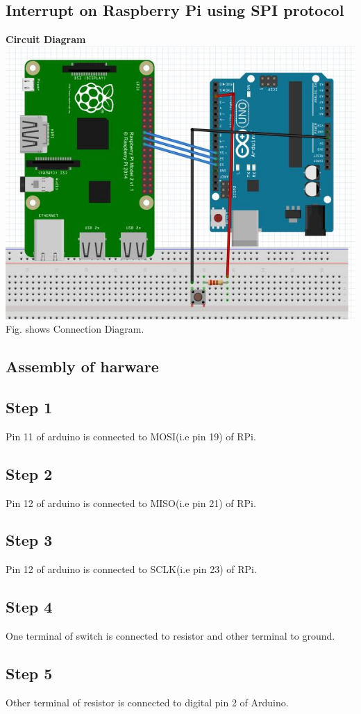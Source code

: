 \documentclass[a4paper,12pt,oneside]{book}
\begin{document}
\subsection*{Interrupt on Raspberry Pi using SPI protocol}
\textbf{Circuit Diagram}  \\
\centering
\includegraphics[scale = 0.6]{rpi_with_arduino_spi}
\flushleft
Fig. shows Connection Diagram.
\subsection*{Assembly of harware}
\subsection*{Step 1}
Pin 11 of arduino is connected to MOSI(i.e pin 19) of RPi.
\subsection*{Step 2}
Pin 12 of arduino is connected to MISO(i.e pin 21) of RPi.
\subsection*{Step 3}
Pin 12 of arduino is connected to SCLK(i.e pin 23) of RPi.
\subsection*{Step 4}
One terminal of switch is connected to resistor and other terminal to ground.
\subsection*{Step 5}
Other terminal of resistor is connected to digital pin 2 of Arduino.
\end{document}
